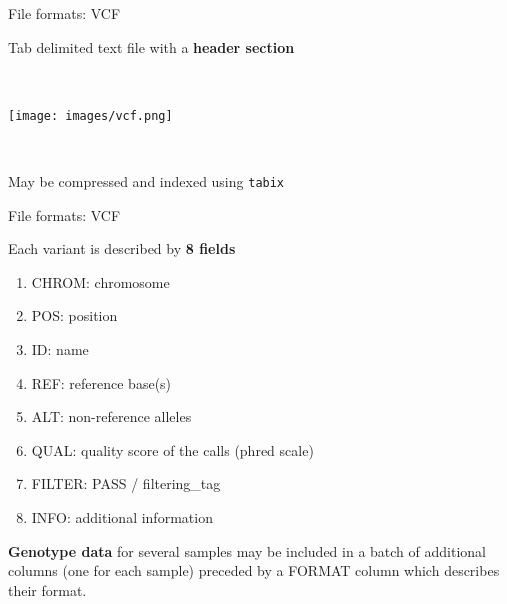 \documentclass{beamer}
\title[{\makebox[.45\paperwidth]{\titulocorto \hfill \insertframenumber/\inserttotalframenumber}}]{\titulolargo}
\subtitle{{\color{gray}\subtitulo}}  %
\author[\autorcorto]{\autorlargo}
\date{\fecha \newline \newline \url{\pagina}}
\begin{document}
\begin{frame}
  \maketitle
\end{frame}

\begin{frame}{File formats: VCF}

Tab delimited text file with a \textbf{header section}

~

\centerline{\texttt{[image: images/vcf.png]}}

~

May be compressed and indexed using \texttt{tabix}

\end{frame}

\begin{frame}{File formats: VCF}

Each variant is described by \textbf{8 fields}

\begin{enumerate}
\def\labelenumi{\arabic{enumi}.}
\item
  CHROM: chromosome
\item
  POS: position
\item
  ID: name
\item
  REF: reference base(s)
\item
  ALT: non-reference alleles
\item
  QUAL: quality score of the calls (phred scale)
\item
  FILTER: PASS / filtering\_tag
\item
  INFO: additional information
\end{enumerate}

\textbf{Genotype data} for several samples may be included in a batch of
additional columns (one for each sample) preceded by a FORMAT column
which describes their format.

\end{frame}
\end{document}

